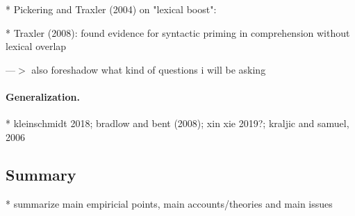 
* Pickering and Traxler (2004) on "lexical boost":


* Traxler (2008): found evidence for syntactic priming in comprehension without lexical overlap


---$>$ also foreshadow what kind of questions i will be asking

\paragraph{Generalization.}

* kleinschmidt 2018;  bradlow and bent (2008); xin xie 2019?; kraljic and samuel, 2006



\subsection{Summary}

* summarize main empiricial points, main accounts/theories  and main issues


